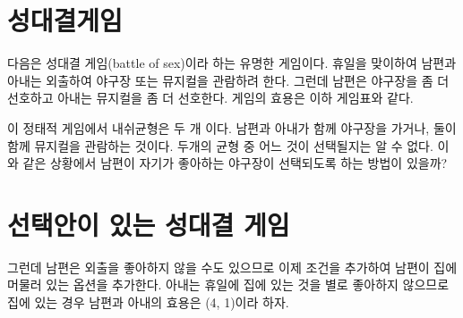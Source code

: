 \documentclass{oblivoir}
\begin{document}
\section{성대결게임}

다음은 성대결 게임(battle of sex)이라 하는 유명한 게임이다. 휴일을 맞이하여 남편과 아내는 외출하여 야구장 또는 뮤지컬을 관람하려 한다. 그런데 남편은 야구장을 좀 더 선호하고 아내는 뮤지컬을 좀 더 선호한다. 게임의 효용은 이하 게임표와 같다.\\

\begin{table}[!htbp]
\begin{center}
\end{center}
\caption{성대결 게임}
\end{table}

이 정태적 게임에서 내쉬균형은 두 개 이다. 남편과 아내가 함께 야구장을 가거나, 둘이 함께 뮤지컬을 관람하는 것이다. 두개의 균형 중 어느 것이 선택될지는 알 수 없다. 이와 같은 상황에서 남편이 자기가 좋아하는 야구장이 선택되도록 하는 방법이 있을까?\\

\section{선택안이 있는 성대결 게임}

그런데 남편은 외출을 좋아하지 않을 수도 있으므로 이제  조건을 추가하여  남편이 집에 머물러 있는 옵션을 추가한다. 아내는 휴일에 집에 있는 것을 별로 좋아하지 않으므로 집에 있는 경우 남편과 아내의 효용은 (4, 1)이라 하자.\\
\end{document}
